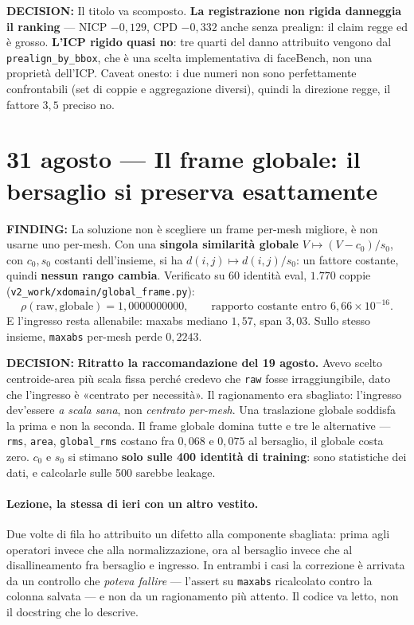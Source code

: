 \documentclass[11pt,a4paper]{article}
\newcommand{\finding}[1]{\textcolor{finding}{\textbf{FINDING:}} #1}
\newcommand{\decision}[1]{\textcolor{decision}{\textbf{DECISION:}} #1}
\begin{document}
\decision{Il titolo va scomposto. \textbf{La registrazione non rigida danneggia il ranking}
--- NICP $-0{,}129$, CPD $-0{,}332$ anche senza prealign: il claim regge ed \`e grosso.
\textbf{L'ICP rigido quasi no}: tre quarti del danno attribuito vengono dal
\texttt{prealign\_by\_bbox}, che \`e una scelta implementativa di faceBench, non una propriet\`a
dell'ICP. Caveat onesto: i due numeri non sono perfettamente confrontabili (set di coppie e
aggregazione diversi), quindi la direzione regge, il fattore $3{,}5$ preciso no.}

\section{31 agosto --- Il frame globale: il bersaglio si preserva esattamente}

\finding{La soluzione non \`e scegliere un frame per-mesh migliore, \`e non usarne uno per-mesh.
Con una \textbf{singola similarit\`a globale} $V \mapsto (V - c_0)/s_0$, con $c_0, s_0$ costanti
dell'insieme, si ha $d(i,j) \mapsto d(i,j)/s_0$: un fattore costante, quindi \textbf{nessun rango
cambia}. Verificato su $60$ identit\`a eval, $1{.}770$ coppie
(\texttt{v2\_work/xdomain/global\_frame.py}):
\[
\rho(\text{raw}, \text{globale}) = 1{,}0000000000, \qquad
\text{rapporto costante entro } 6{,}66\times 10^{-16}.
\]
E l'ingresso resta allenabile: maxabs mediano $1{,}57$, span $3{,}03$. Sullo stesso insieme,
\texttt{maxabs} per-mesh perde $0{,}2243$.}

\decision{\textbf{Ritratto la raccomandazione del 19 agosto.} Avevo scelto centroide-area pi\`u
scala fissa perch\'e credevo che \texttt{raw} fosse irraggiungibile, dato che l'ingresso \`e
«centrato per necessit\`a». Il ragionamento era sbagliato: l'ingresso dev'essere \emph{a scala
sana}, non \emph{centrato per-mesh}. Una traslazione globale soddisfa la prima e non la seconda.
Il frame globale domina tutte e tre le alternative --- \texttt{rms}, \texttt{area},
\texttt{global\_rms} costano fra $0{,}068$ e $0{,}075$ al bersaglio, il globale costa zero.
$c_0$ e $s_0$ si stimano \textbf{solo sulle 400 identit\`a di training}: sono statistiche dei
dati, e calcolarle sulle 500 sarebbe leakage.}

\paragraph{Lezione, la stessa di ieri con un altro vestito.} Due volte di fila ho attribuito un
difetto alla componente sbagliata: prima agli operatori invece che alla normalizzazione, ora al
bersaglio invece che al disallineamento fra bersaglio e ingresso. In entrambi i casi la
correzione \`e arrivata da un controllo che \emph{poteva fallire} --- l'assert su
\texttt{maxabs} ricalcolato contro la colonna salvata --- e non da un ragionamento pi\`u
attento. Il codice va letto, non il docstring che lo descrive.
\end{document}
